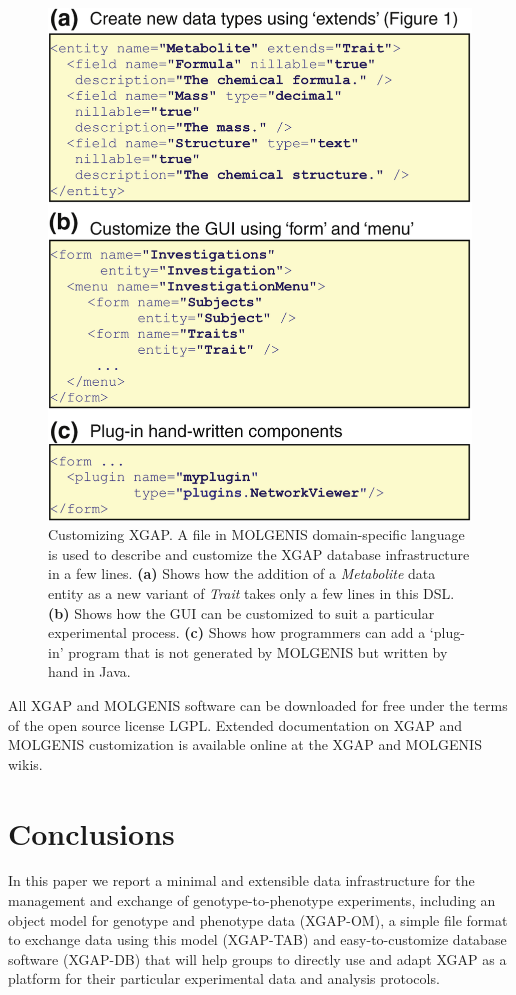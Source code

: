 \begin{figure}
	\includegraphics[width=0.97\linewidth]{img/xgap_custom}
	\caption[Customizing XGAP]{Customizing XGAP. A file in MOLGENIS domain-specific language is used to describe and customize the XGAP database infrastructure in a few lines. \textbf{(a)} Shows how the addition of a \textsl{Metabolite} data entity as a new variant of \textsl{Trait} takes only a few lines in this DSL. \textbf{(b)} Shows how the GUI can be customized to suit a particular experimental process. \textbf{(c)} Shows how programmers can add a ‘plug-in’ program that is not generated by MOLGENIS but written by hand in Java.}
	\label{fig:xgap_custom}
\end{figure}

All XGAP and MOLGENIS software can be downloaded for free under the terms of the open source license LGPL.
Extended documentation on XGAP and MOLGENIS customization is available online at the XGAP and MOLGENIS wikis\cite{xgap_url, xgap_molgenurl}.

\section{Conclusions}
In this paper we report a minimal and extensible data infrastructure for the management and exchange of genotype-to-phenotype experiments, including an object model for genotype and phenotype data (XGAP-OM), a simple file format to exchange data using this model (XGAP-TAB) and easy-to-customize database software (XGAP-DB) that will help groups to directly use and adapt XGAP as a platform for their particular experimental data and analysis protocols.

